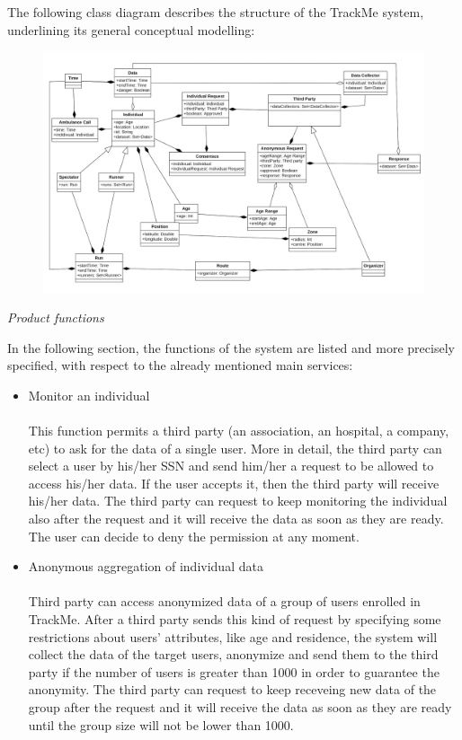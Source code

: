 \documentclass{article}
\begin{document}
\begin{legal}
\begin{legal}
{The following class diagram describes the structure of the TrackMe system, underlining its general conceptual modelling:
			}
			\begin{figure}[H]
  			\includegraphics[width=\linewidth]{./images/UML1-0.png}
			\end{figure}
		\item \textit{Product functions} \\
		{\normalfont
In the following section, the functions of the system are listed and more precisely specified, with
respect to the already mentioned main services:
		\begin{itemize}
		\item Monitor an individual\\\\
		This function permits a third party (an association, an hospital, a company, etc) to ask for the data of a single user. More in detail, the third party can select a user by his/her SSN and send him/her a request to be allowed to access his/her data. If the user accepts it, then the third party will receive his/her data. The third party can request to keep monitoring the individual also after the request and it will receive the data as soon as they are ready. The user can decide to deny the permission at any moment. \\
		\item Anonymous aggregation of individual data\\\\
		Third party can access anonymized data of a group of users enrolled in TrackMe. After a third party sends this kind of request by specifying some restrictions about users’ attributes, like age and residence, the system will collect the data of the target users, anonymize and send them to the third party if the number of users is greater than 1000 in order to guarantee the anonymity. The third party can request to keep receveing new data of the group after the request and it will receive the data as soon as they are ready until the group size will not be lower than 1000.\\

\end{itemize}}
\end{legal}
\end{legal}
\end{document}
